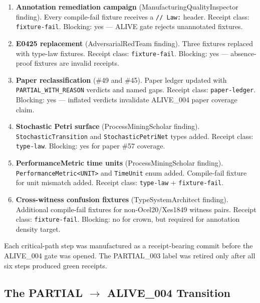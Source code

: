 \begin{enumerate}
  \item \textbf{Annotation remediation campaign} (ManufacturingQualityInspector
    finding). Every compile-fail fixture receives a \texttt{// Law:} header.
    Receipt class: \texttt{fixture-fail}. Blocking: yes --- ALIVE gate rejects
    unannotated fixtures.

  \item \textbf{E0425 replacement} (AdversarialRedTeam finding). Three fixtures
    replaced with type-law fixtures. Receipt class: \texttt{fixture-fail}.
    Blocking: yes --- absence-proof fixtures are invalid receipts.

  \item \textbf{Paper reclassification} (\#49 and \#45). Paper ledger updated
    with \texttt{PARTIAL\_WITH\_REASON} verdicts and named gaps. Receipt class:
    \texttt{paper-ledger}. Blocking: yes --- inflated verdicts invalidate
    ALIVE\_004 paper coverage claim.

  \item \textbf{Stochastic Petri surface} (ProcessMiningScholar finding).
    \texttt{StochasticTransition} and \texttt{StochasticPetriNet} types added.
    Receipt class: \texttt{type-law}. Blocking: yes for paper \#57 coverage.

  \item \textbf{PerformanceMetric time units} (ProcessMiningScholar finding).
    \texttt{PerformanceMetric<UNIT>} and \texttt{TimeUnit} enum added.
    Compile-fail fixture for unit mismatch added. Receipt class:
    \texttt{type-law} + \texttt{fixture-fail}.

  \item \textbf{Cross-witness confusion fixtures} (TypeSystemArchitect finding).
    Additional compile-fail fixtures for non-Ocel20/Xes1849 witness pairs.
    Receipt class: \texttt{fixture-fail}. Blocking: no for crown, but
    required for annotation density target.
\end{enumerate}

Each critical-path step was manufactured as a receipt-bearing commit before
the ALIVE\_004 gate was opened. The PARTIAL\_003 label was retired only after
all six steps produced green receipts.

\subsection{The PARTIAL \texorpdfstring{$\to$}{->} ALIVE\_004 Transition}

